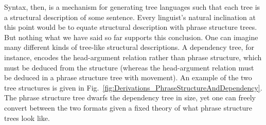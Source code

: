 Syntax, then, is a mechanism for generating tree languages such that each tree is a structural description of some sentence.
Every linguist's natural inclination at this point would be to equate structural description with phrase structure trees.
But nothing what we have said so far supports this conclusion.
One can imagine many different kinds of tree-like structural descriptions.
A dependency tree, for instance, encodes the head-argument relation rather than phrase structure, which must be deduced from the structure (whereas the head-argument relation must be deduced in a phrase structure tree with movement).
An example of the two tree structures is given in Fig.~\ref{fig:Derivations_PhraseStructureAndDependency}.
The phrase structure tree dwarfs the dependency tree in size, yet one can freely convert between the two formats given a fixed theory of what phrase structure trees look like.
%
